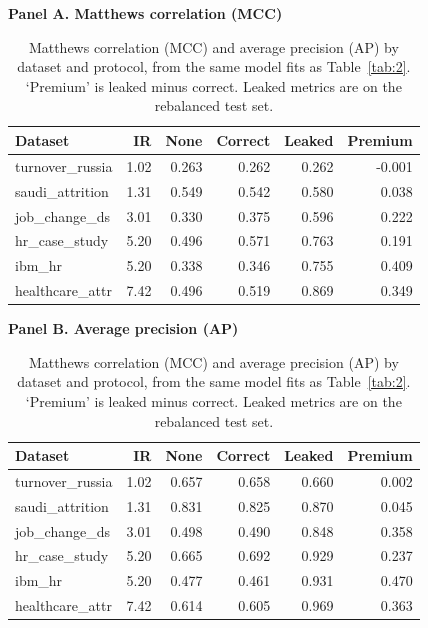 \documentclass[12pt,a4paper]{article}
\begin{document}
\begin{table}[p]
\centering\singlespacing\small\setlength{\tabcolsep}{3pt}
\caption{Matthews correlation (MCC) and average precision (AP) by dataset and protocol, from the same model fits as Table~\ref{tab:2}. `Premium' is leaked minus correct. Leaked metrics are on the rebalanced test set.}
\label{tab:3}
\par\medskip\textbf{Panel A. Matthews correlation (MCC)}\par\smallskip
\begin{tabularx}{\textwidth}{@{}Xrrrrr@{}}
\toprule
\textbf{Dataset} & \textbf{IR} & \textbf{None} & \textbf{Correct} & \textbf{Leaked} & \textbf{Premium} \\
\midrule
turnover\_russia & 1.02 & 0.263 & 0.262 & 0.262 & -0.001 \\
saudi\_attrition & 1.31 & 0.549 & 0.542 & 0.580 & 0.038 \\
job\_change\_ds & 3.01 & 0.330 & 0.375 & 0.596 & 0.222 \\
hr\_case\_study & 5.20 & 0.496 & 0.571 & 0.763 & 0.191 \\
ibm\_hr & 5.20 & 0.338 & 0.346 & 0.755 & 0.409 \\
healthcare\_attr & 7.42 & 0.496 & 0.519 & 0.869 & 0.349 \\
\bottomrule
\end{tabularx}
\par\medskip\textbf{Panel B. Average precision (AP)}\par\smallskip
\begin{tabularx}{\textwidth}{@{}Xrrrrr@{}}
\toprule
\textbf{Dataset} & \textbf{IR} & \textbf{None} & \textbf{Correct} & \textbf{Leaked} & \textbf{Premium} \\
\midrule
turnover\_russia & 1.02 & 0.657 & 0.658 & 0.660 & 0.002 \\
saudi\_attrition & 1.31 & 0.831 & 0.825 & 0.870 & 0.045 \\
job\_change\_ds & 3.01 & 0.498 & 0.490 & 0.848 & 0.358 \\
hr\_case\_study & 5.20 & 0.665 & 0.692 & 0.929 & 0.237 \\
ibm\_hr & 5.20 & 0.477 & 0.461 & 0.931 & 0.470 \\
healthcare\_attr & 7.42 & 0.614 & 0.605 & 0.969 & 0.363 \\
\bottomrule
\end{tabularx}
\end{table}
\clearpage
\end{document}
